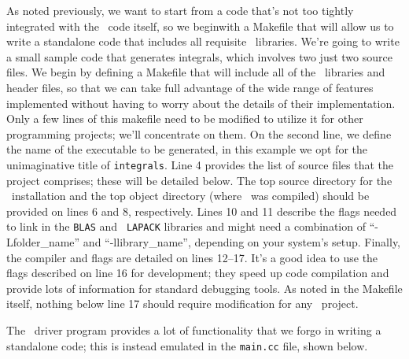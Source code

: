 As noted previously, we want to start from a code that's not too tightly
integrated with the \PSIfour\ code itself, so we beginwith a Makefile that will
allow us to write a standalone code that includes all requisite \PSI\
libraries.  We're going to write a small sample code that generates integrals,
which involves two just two source files.  We begin by defining a Makefile that
will include all of the \PSIfour\ libraries and header files, so that we can
take full advantage of the wide range of features implemented without having to
worry about the details of their implementation.
\newpage
{}
Only a few lines of this makefile need to be modified to utilize it for other
programming projects; we'll concentrate on them.  On the second line, we define
the name of the executable to be generated, in this example we opt for the
unimaginative title of {\tt integrals}.  Line 4 provides the list of source files
that the project comprises; these will be detailed below.  The top source
directory for the \PSIfour\ installation and the top object directory (where
\PSIfour\ was compiled) should be provided on lines 6 and 8, respectively.
Lines 10 and 11 describe the flags needed to link in the {\tt BLAS} and {\tt
LAPACK} libraries and might need a combination of ``-Lfolder\_name'' and
``-llibrary\_name'', depending on your system's setup.  Finally, the compiler
and flags are detailed on lines 12--17.  It's a good idea to use the flags
described on line 16 for development; they speed up code compilation and
provide lots of information for standard debugging tools.  As noted in the
Makefile itself, nothing below line 17 should require modification for any
\PSIfour\ project.

The \PSIfour\ driver program provides a lot of functionality that we forgo in
writing a standalone code; this is instead emulated in the {\tt main.cc} file,
shown below.  

